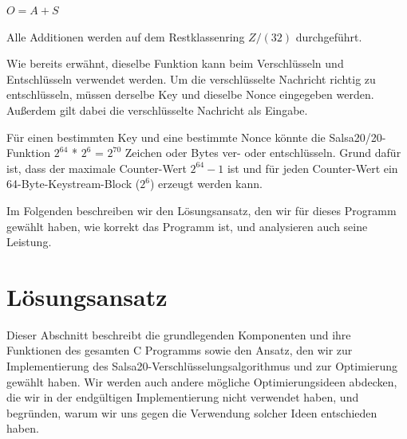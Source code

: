 \documentclass[course=erap]{aspdoc}
\begin{document}
\begin{center}
	\(O = A + S\)
\end{center}
Alle Additionen werden auf dem Restklassenring \(Z/(32)\) durchgeführt.

Wie bereits erwähnt, dieselbe Funktion kann beim Verschlüsseln und Entschlüsseln verwendet werden. Um die verschlüsselte Nachricht richtig zu entschlüsseln, müssen derselbe Key und dieselbe Nonce eingegeben werden. Außerdem gilt dabei die verschlüsselte Nachricht als Eingabe.



Für einen bestimmten Key und eine bestimmte Nonce könnte die Salsa20/20-Funktion \(2^{64}\) * \(2^{6}\) = \(2^{70}\) Zeichen oder Bytes ver- oder entschlüsseln. Grund dafür ist, dass der maximale Counter-Wert \(2^{64}-1\) ist und für jeden Counter-Wert ein 64-Byte-Keystream-Block (\(2^{6}\)) erzeugt werden kann.

Im Folgenden beschreiben wir den Lösungsansatz, den wir für dieses Programm gewählt haben, wie korrekt das Programm ist, und analysieren auch seine Leistung. 





\section{Lösungsansatz}
Dieser Abschnitt beschreibt die grundlegenden Komponenten und ihre Funktionen des gesamten C Programms sowie den Ansatz, den wir zur Implementierung des Salsa20-Verschlüsselungsalgorithmus und zur Optimierung gewählt haben. Wir werden auch andere mögliche Optimierungsideen abdecken, die wir in der endgültigen Implementierung nicht verwendet haben, und begründen, warum wir uns gegen die Verwendung solcher Ideen entschieden haben.
\end{document}
